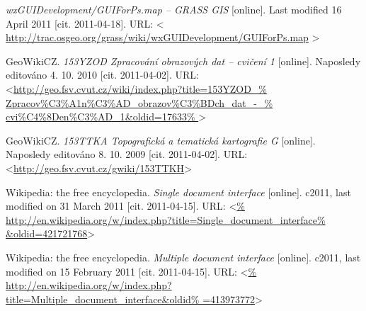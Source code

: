 \documentclass[a4paper,12pt,draft]{article}
\newif\ifbc %
\begin{document}
\begin{thebibliography}{99}
\ifbc
\bibitem{trac}
\textit{GRASS GIS Tracker and Wiki} [online]. Last modified 12 April 2011
[cit. 2011-04-20].
URL: \textless\url{http://trac.osgeo.org/grass}\textgreater
\fi

\textit{wxGUIDevelopment/GUIForPs.map -- GRASS GIS} [online]. Last modified
16 April 2011 [cit. 2011-04-18]. URL: \textless
\url{http://trac.osgeo.org/grass/wiki/wxGUIDevelopment/GUIForPs.map}
\textgreater

\ifbc
\bibitem{instalace}
GRASS-Wiki. \textit{Installation Guide} [online]. Last modified
10 February 2009 [cit. 2011-04-18]. URL: \textless
\url{%
http://grass.osgeo.org/grass-wiki/index.php?title=Installation_Guide&oldid=8141}
\textgreater



\bibitem{ArcCR500}
ARCDATA PRAHA, s.r.o. \textit{ARCDATA PRAHA - ArcČR 500} [online].
c1992–2006 ARCDATA PRAHA, s.r.o., poslední změna: 7. 12. 2007 [cit. 2011-04-23].
URL: \textless
\url{http://old.arcdata.cz/data/} \textgreater

\fi

GeoWikiCZ. \textit{153YZOD Zpracování obrazových dat -- cvičení 1} [online].
Naposledy editováno 4. 10. 2010 [cit. 2011-04-02].
URL: \textless\url{http://geo.fsv.cvut.cz/wiki/index.php?title=153YZOD_%
Zpracov\%C3\%A1n\%C3\%AD_obrazov\%C3\%BDch_dat_-_%
cvi\%C4\%8Den\%C3\%AD_1&oldid=17633%
}\textgreater



\ifbc
{}
GeoWikiCZ. \textit{153TTKA Topografická a tematická kartografie G} [online].
Naposledy editováno 8. 10. 2009 [cit. 2011-04-02].
URL: \textless\url{http://geo.fsv.cvut.cz/gwiki/153TTKH}\textgreater


Wikipedia: the free encyclopedia. \textit{Single document interface}
[online]. c2011, last modified on 31 March 2011 [cit. 2011-04-15]. URL: 
\textless\url{%
http://en.wikipedia.org/w/index.php?title=Single_document_interface%
&oldid=421721768}\textgreater

Wikipedia: the free encyclopedia. \textit{Multiple document interface}
[online]. c2011, last modified on 15 February 2011 [cit. 2011-04-15]. URL:
\textless\url{%
http://en.wikipedia.org/w/index.php?title=Multiple_document_interface&oldid%
=413973772}\textgreater


\end{thebibliography}
\end{document}
